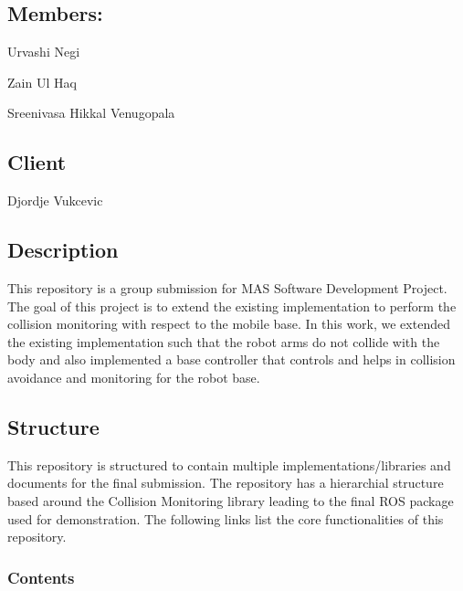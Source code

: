 \subsection*{Members\+:}


\begin{DoxyItemize}
\item Urvashi Negi
\item Zain Ul Haq
\item Sreenivasa Hikkal Venugopala
\end{DoxyItemize}

\subsection*{Client}


\begin{DoxyItemize}
\item Djordje Vukcevic
\end{DoxyItemize}

\subsection*{Description}

This repository is a group submission for M\+AS Software Development Project. The goal of this project is to extend the existing implementation to perform the collision monitoring with respect to the mobile base. In this work, we extended the existing implementation such that the robot arms do not collide with the body and also implemented a base controller that controls and helps in collision avoidance and monitoring for the robot base.

\subsection*{Structure}

This repository is structured to contain multiple implementations/libraries and documents for the final submission. The repository has a hierarchial structure based around the Collision Monitoring library leading to the final R\+OS package used for demonstration. The following links list the core functionalities of this repository.

\subsubsection*{Contents}


